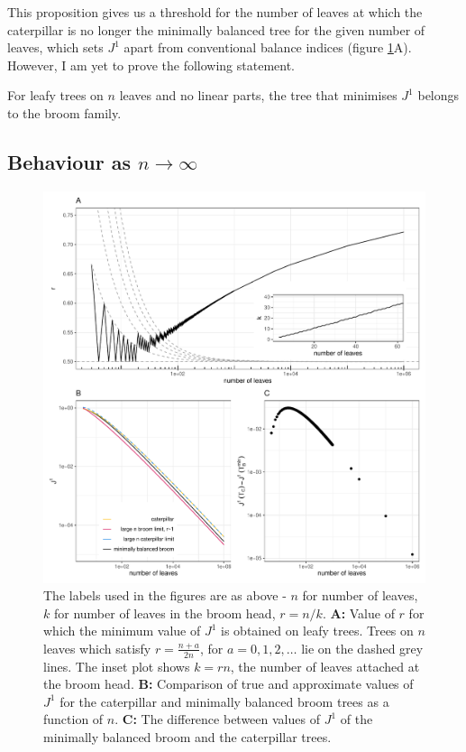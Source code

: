 This proposition gives us a threshold for the number of leaves at which the
caterpillar is no longer the minimally balanced tree for the given number of
leaves, which sets $J^1$ apart from conventional balance indices (figure
\ref{Rfigures}A). However, I am yet to prove the following statement.

\begin{conjecture}\label{conj}
    For leafy trees on $n$ leaves and no linear parts, the tree that minimises
    $J^1$ belongs to the broom family.
\end{conjecture}

\subsection{Behaviour as $n\to\infty$}

\begin{figure}[h!]
    \begin{center}
    \includegraphics[width = \textwidth]{Chapter_2/figures/j1_figure_3_plots.pdf}
    \caption{The labels used in the figures are as above - $n$ for number of
        leaves, $k$ for number of leaves in the broom head, $r=n/k$.
        \textbf{A:} Value of $r$ for which the minimum value of $J^1$ is
        obtained on leafy trees. Trees on $n$ leaves which satisfy
        $r = \frac{n+a}{2n}$, for $a=0,1,2,\dots$ lie on the dashed grey lines.
        The inset plot shows $k = rn$, the number of leaves attached at the
        broom head. \textbf{B:} Comparison of true and approximate values of
        $J^1$ for the caterpillar and minimally balanced broom trees as a
        function of $n$. \textbf{C:} The difference between values of $J^1$ of
        the minimally balanced broom and the caterpillar trees.}
    \label{Rfigures}
    \end{center}
\end{figure}
\clearpage

